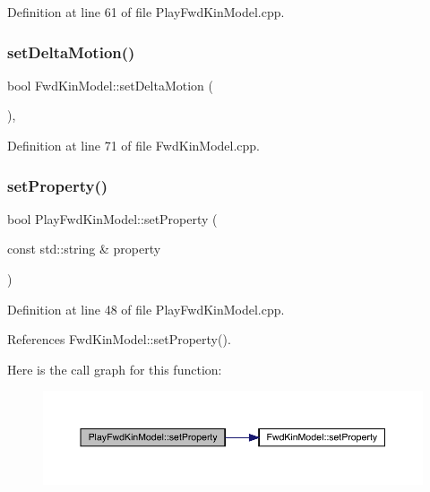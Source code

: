 Definition at line 61 of file Play\+Fwd\+Kin\+Model.\+cpp.

\mbox{\label{classFwdKinModel_a12b54bd62ba5cf218973c600c66ba39e}} 
\subsubsection{\texorpdfstring{set\+Delta\+Motion()}{setDeltaMotion()}}
{\footnotesize\ttfamily bool Fwd\+Kin\+Model\+::set\+Delta\+Motion (\begin{DoxyParamCaption}{ }\end{DoxyParamCaption})\hspace{0.3cm}{\ttfamily [protected]}, {\ttfamily [inherited]}}



Definition at line 71 of file Fwd\+Kin\+Model.\+cpp.

\mbox{\label{classPlayFwdKinModel_ae7f9432ed4f7069442821dbfa598321d}} 
\subsubsection{\texorpdfstring{set\+Property()}{setProperty()}}
{\footnotesize\ttfamily bool Play\+Fwd\+Kin\+Model\+::set\+Property (\begin{DoxyParamCaption}\item[{const std\+::string \&}]{property }\end{DoxyParamCaption})\hspace{0.3cm}{\ttfamily [override]}}



Definition at line 48 of file Play\+Fwd\+Kin\+Model.\+cpp.



References Fwd\+Kin\+Model\+::set\+Property().

Here is the call graph for this function\+:
\nopagebreak
\begin{figure}[H]
\begin{center}
\leavevmode
\includegraphics[width=350pt]{classPlayFwdKinModel_ae7f9432ed4f7069442821dbfa598321d_cgraph}
\end{center}
\end{figure}


